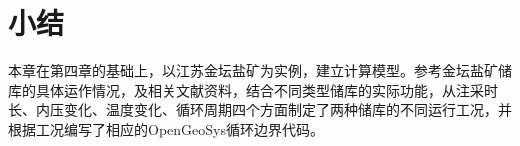 






\section{小结}

本章在第四章的基础上，以江苏金坛盐矿为实例，建立计算模型。参考金坛盐矿储库的具体运作情况，及相关文献资料，结合不同类型储库的实际功能，从注采时长、内压变化、温度变化、循环周期四个方面制定了两种储库的不同运行工况，并根据工况编写了相应的OpenGeoSys循环边界代码。

